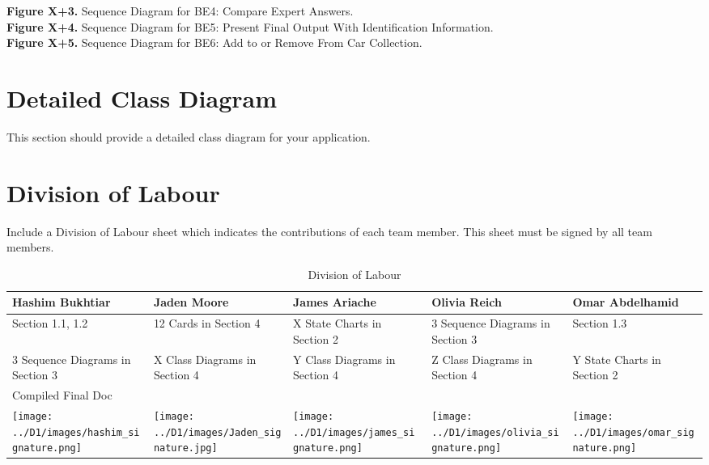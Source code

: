 \documentclass[]{article}
\begin{document}
\begin{center}
	\textbf{Figure X+3.} Sequence Diagram for BE4: Compare Expert Answers.\\

	\textbf{Figure X+4.} Sequence Diagram for BE5: Present Final Output With Identification Information.\\

	\textbf{Figure X+5.} Sequence Diagram for BE6: Add to or Remove From Car Collection.\\
\end{center}

\section{Detailed Class Diagram}
\label{sec:detailed_class_diagram}
This section should provide a detailed class diagram for your application.

\appendix
\section{Division of Labour}
\label{sec:division_of_labour}
Include a Division of Labour sheet which indicates the contributions of each team member. This sheet must be signed by all team members.

\begin{table}[h!]
\centering
\begin{tabular}{|p{3.5cm}|p{3.5cm}|p{3cm}|p{3.5cm}|p{3cm}|}
\hline
Hashim Bukhtiar & Jaden Moore & James Ariache & Olivia Reich & Omar Abdelhamid \\ \hline
Section 1.1, 1.2 & 12 Cards in Section 4 & X State Charts in Section 2 & 3 Sequence Diagrams in Section 3 & Section 1.3 \\ 
3 Sequence Diagrams in Section 3 & X Class Diagrams in Section 4 & Y Class Diagrams in Section 4 & Z Class Diagrams in Section 4 & Y State Charts in Section 2 \\
Compiled Final Doc &  &  &  & \\

\texttt{[image: ../D1/images/hashim\_signature.png]} & \texttt{[image: ../D1/images/Jaden\_signature.jpg]} &
\texttt{[image: ../D1/images/james\_signature.png]}& \texttt{[image: ../D1/images/olivia\_signature.png]} & \texttt{[image: ../D1/images/omar\_signature.png]}  \\
\hline
\end{tabular}
\caption{Division of Labour} 
\label{tab:division_of_labour}
\end{table}
\end{document}
